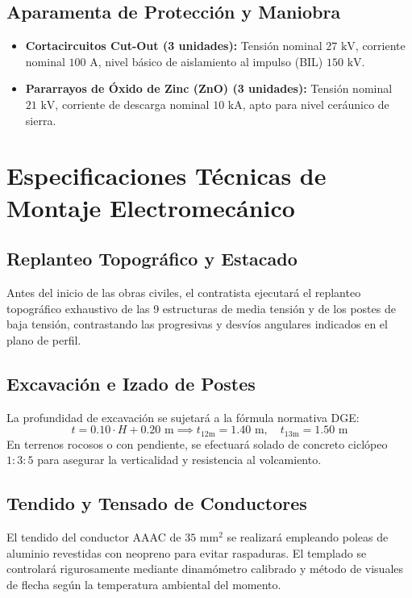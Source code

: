 \documentclass[12pt,a4paper]{report}
\begin{document}
\section{Aparamenta de Protección y Maniobra}
\begin{itemize}
    \item \textbf{Cortacircuitos Cut-Out (3 unidades):} Tensión nominal $27\text{ kV}$, corriente nominal $100\text{ A}$, nivel básico de aislamiento al impulso (BIL) $150\text{ kV}$.
    \item \textbf{Pararrayos de Óxido de Zinc (ZnO) (3 unidades):} Tensión nominal $21\text{ kV}$, corriente de descarga nominal $10\text{ kA}$, apto para nivel ceráunico de sierra.
\end{itemize}

\chapter{Especificaciones Técnicas de Montaje Electromecánico}

\section{Replanteo Topográfico y Estacado}
Antes del inicio de las obras civiles, el contratista ejecutará el replanteo topográfico exhaustivo de las 9 estructuras de media tensión y de los postes de baja tensión, contrastando las progresivas y desvíos angulares indicados en el plano de perfil.

\section{Excavación e Izado de Postes}
La profundidad de excavación se sujetará a la fórmula normativa DGE:
\begin{equation}
    t = 0.10 \cdot H + 0.20\text{ m} \implies t_{12\text{m}} = 1.40\text{ m}, \quad t_{13\text{m}} = 1.50\text{ m}
\end{equation}
En terrenos rocosos o con pendiente, se efectuará solado de concreto ciclópeo $1:3:5$ para asegurar la verticalidad y resistencia al volcamiento.

\section{Tendido y Tensado de Conductores}
El tendido del conductor AAAC de $35\text{ mm}^2$ se realizará empleando poleas de aluminio revestidas con neopreno para evitar raspaduras. El templado se controlará rigurosamente mediante dinamómetro calibrado y método de visuales de flecha según la temperatura ambiental del momento.
\end{document}
